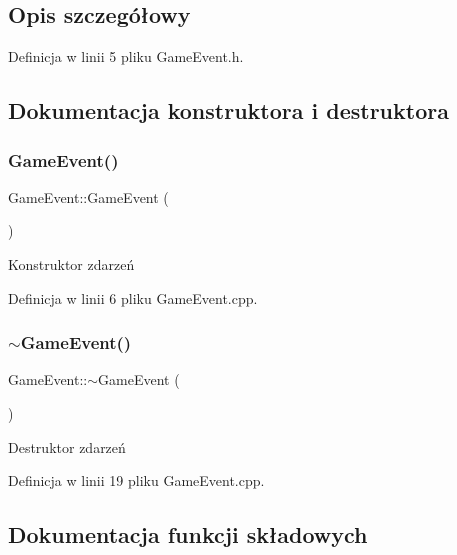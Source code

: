 \subsection{Opis szczegółowy}


Definicja w linii 5 pliku Game\+Event.\+h.



\subsection{Dokumentacja konstruktora i destruktora}
\mbox{\label{class_game_event_a0a8133b65ffc98712879d18186ef3020}} 
\subsubsection{\texorpdfstring{Game\+Event()}{GameEvent()}}
{\footnotesize\ttfamily Game\+Event\+::\+Game\+Event (\begin{DoxyParamCaption}{ }\end{DoxyParamCaption})}



Konstruktor zdarzeń 



Definicja w linii 6 pliku Game\+Event.\+cpp.

\mbox{\label{class_game_event_aaf514ed35c80bbbcc54ce411d9d71eef}} 
\subsubsection{\texorpdfstring{$\sim$\+Game\+Event()}{~GameEvent()}}
{\footnotesize\ttfamily Game\+Event\+::$\sim$\+Game\+Event (\begin{DoxyParamCaption}{ }\end{DoxyParamCaption})\hspace{0.3cm}{\ttfamily [virtual]}}



Destruktor zdarzeń 



Definicja w linii 19 pliku Game\+Event.\+cpp.



\subsection{Dokumentacja funkcji składowych}
\mbox{\label{class_game_event_a683bf5025fe1a31263cb96059fc9e5a5}} 
